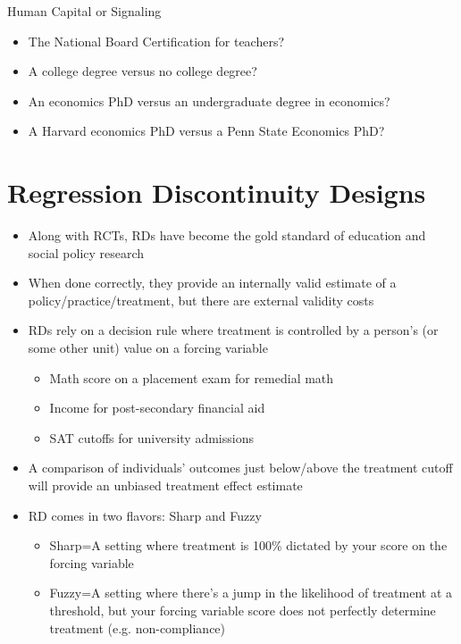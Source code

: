 \documentclass{beamer}
\begin{document}
\begin{frame}[<+->]{Human Capital or Signaling}
    \begin{itemize}
        \item The National Board Certification for teachers?
        \item A college degree versus no college degree?
        \item An economics PhD versus an undergraduate degree in economics?
        \item A Harvard economics PhD versus a Penn State Economics PhD?
    \end{itemize}
    
\end{frame}

\section{Regression Discontinuity Designs}
\frame{\sectionpage}

\begin{frame}[<+->]
	\begin{itemize}
		\item Along with RCTs, RDs have become the gold standard of education and social policy research
		\item When done correctly, they provide an internally valid estimate of a policy/practice/treatment, but there are external validity costs
		\item RDs rely on a decision rule where treatment is controlled by a person's (or some other unit) value on a forcing variable \medskip
		\begin{itemize}
			\item Math score on a placement exam for remedial math
			\item Income for post-secondary financial aid
			\item SAT cutoffs for university admissions
		\end{itemize}
			\item A comparison of individuals' outcomes just below/above the treatment cutoff will provide an unbiased treatment effect estimate
			\item RD comes in two flavors: Sharp and Fuzzy
			\begin{itemize}
				\item Sharp=A setting where treatment is 100\% dictated by your score on the forcing variable
				\item Fuzzy=A setting where there's a jump in the likelihood of treatment at a threshold, but your forcing variable score does not perfectly determine treatment (e.g. non-compliance)
			\end{itemize}
		\end{itemize}

\end{frame}
\end{document}
